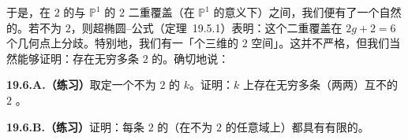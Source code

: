 于是，在\trGenus{} $2$ 的\trCurve{}与 $\mathbb{P}^1$ 的\trGenus{} $2$ 二重覆盖（在 $\mathbb{P}^1$ 的\trAutomorphism{}意义下）之间，我们便有了一个自然的\trBijection。若\trCharacteristic{}不为 $2$，则超椭圆\trRiemann--\trHurwitz{}公式（\mbox{定理~19.5.1}）表明：这个二重覆盖在 $2g+2=6$ 个几何点上分歧。特别地，我们有一「个三维的\trGenus{} $2$ \trCurve{}空间」。这并不严格，但我们当然能够证明：存在无穷多条\trGenus{} $2$ 的\trCurve。确切地说：

\textbf{19.6.A.（练习）}\quad 取定一个\trCharacteristic{}不为 $2$ 的\trAlgClosedField{} $k$。证明：$k$ 上存在无穷多条（两两）互不\trIsomorphic{}的\trGenus{} $2$ \trCurve。

\textbf{19.6.B.（练习）}\quad 证明：每条\trGenus{} $2$ 的\trCurve{}（在\trCharacteristic{}不为 $2$ 的任意域上）都具有有限的\trAutomorphismGroup。
